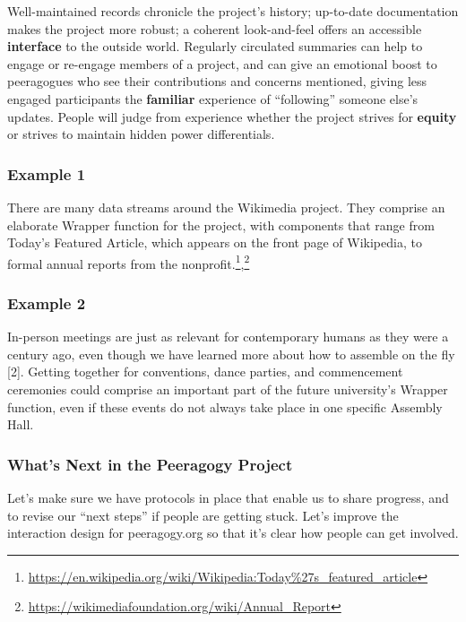 Well-maintained records chronicle the project's history; up-to-date
documentation makes the project more robust; a coherent look-and-feel
offers an accessible \textbf{interface} to the outside world. Regularly
circulated summaries can help to engage or re-engage members of a
project, and can give an emotional boost to peeragogues who see their
contributions and concerns mentioned, giving less engaged participants
the \textbf{familiar} experience of ``following'' someone else's
updates. People will judge from experience whether the project strives
for \textbf{equity} or strives to maintain hidden power differentials.

\hypertarget{example-1}{%
\subsubsection{Example 1}\label{example-1}}

There are many data streams around the Wikimedia project. They comprise
an elaborate {{Wrapper}} function for the project, with components that
range from Today's Featured Article, which appears on the front page of
Wikipedia, to formal annual reports from the
nonprofit.\footnote{\url{https://en.wikipedia.org/wiki/Wikipedia:Today\%27s_featured_article}},\footnote{\url{https://wikimediafoundation.org/wiki/Annual_Report}}

\hypertarget{example-2}{%
\subsubsection{Example 2}\label{example-2}}

In-person meetings are just as relevant for contemporary humans as they
were a century ago, even though we have learned more about how to
assemble on the fly {{[}2{]}}. Getting together for conventions, dance
parties, and commencement ceremonies could comprise an important part of
the future university's {{Wrapper}} function, even if these events do
not always take place in one specific Assembly Hall.

\hypertarget{whats-next-in-the-peeragogy-project}{%
\subsubsection{What's Next in the Peeragogy
Project}\label{whats-next-in-the-peeragogy-project}}

Let's make sure we have protocols in place that enable us to share
progress, and to revise our ``next steps'' if people are getting stuck.
Let's improve the interaction design for peeragogy.org so that it's
clear how people can get involved.

